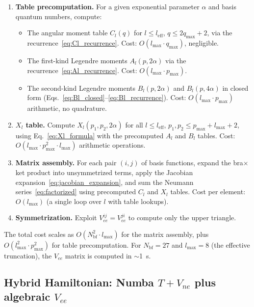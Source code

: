\documentclass[aps,pra,twocolumn,superscriptaddress,longbibliography]{revtex4-2}
\begin{document}
\begin{enumerate}
  \item \textbf{Table precomputation.}  For a given exponential
    parameter $\alpha$ and basis quantum numbers, compute:
    \begin{itemize}
      \item The angular moment table $C_l(q)$ for $l \leq l_{\mathrm{eff}}$,
        $q \leq 2q_{\max} + 2$, via the recurrence~\eqref{eq:Cl_recurrence}.
        Cost: $O(l_{\max} \cdot q_{\max})$, negligible.
      \item The first-kind Legendre moments $A_l(p, 2\alpha)$ via
        the recurrence~\eqref{eq:Al_recurrence}.  Cost: $O(l_{\max} \cdot p_{\max})$.
      \item The second-kind Legendre moments $B_l(p, 2\alpha)$ and
        $B_l(p, 4\alpha)$ in closed form
        (Eqs.~\eqref{eq:Bl_closed}--\eqref{eq:Bl_recurrence}).
        Cost: $O(l_{\max} \cdot p_{\max})$ arithmetic, no quadrature.
    \end{itemize}
  \item \textbf{$X_l$ table.}  Compute
    $X_l(p_1, p_2, 2\alpha)$ for all
    $l \leq l_{\mathrm{eff}}$, $p_1, p_2 \leq p_{\max}+l_{\max}+2$,
    using Eq.~\eqref{eq:Xl_formula} with the precomputed
    $A_l$ and $B_l$ tables.  Cost: $O(l_{\max} \cdot p_{\max}^2
    \cdot l_{\max})$ arithmetic operations.
  \item \textbf{Matrix assembly.}  For each pair $(i, j)$ of
    basis functions, expand the bra$\times$ket product into
    unsymmetrized terms, apply the Jacobian
    expansion~\eqref{eq:jacobian_expansion}, and sum the
    Neumann series~\eqref{eq:factorized} using precomputed
    $C_l$ and $X_l$ tables.  Cost per element: $O(l_{\max})$
    (a single loop over $l$ with table lookups).
  \item \textbf{Symmetrization.}  Exploit $V_{ee}^{ij} = V_{ee}^{ji}$
    to compute only the upper triangle.
\end{enumerate}

The total cost scales as $O(N_{\mathrm{bf}}^2 \cdot l_{\max})$
for the matrix assembly, plus $O(l_{\max}^2 \cdot p_{\max}^2)$
for table precomputation.  For $N_{\mathrm{bf}} = 27$ and
$l_{\max} = 8$ (the effective truncation), the $V_{ee}$ matrix
is computed in $\sim$1~s.

\subsection{Hybrid Hamiltonian: Numba \texorpdfstring{$T + V_{ne}$}{T+Vne}
plus algebraic \texorpdfstring{$V_{ee}$}{Vee}}
\end{document}
